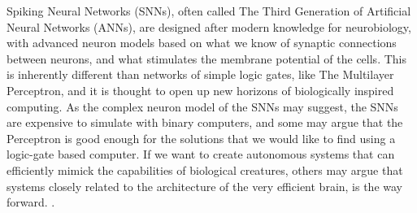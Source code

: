Spiking Neural Networks (SNNs), often called The Third Generation of Artificial Neural Networks (ANNs), are designed after modern knowledge for neurobiology,
with advanced neuron models based on what we know of synaptic connections between neurons, and what stimulates the membrane potential of the cells.\cite{ghosh-dastidar_improved_2007}
This is inherently different than networks of simple logic gates, like The Multilayer Perceptron, and it is thought to open up new horizons of biologically inspired computing.\cite{cowan_discussion_1990} \cite{aamir_accelerated_2018}
As the complex neuron model of the SNNs may suggest, the SNNs are expensive to simulate with binary computers, and some may argue that the Perceptron is good enough for the solutions that we would like to find using a logic-gate based computer.
If we want to create autonomous systems that can efficiently mimick the capabilities of biological creatures, others may argue that systems closely related to the architecture of the very efficient brain, is the way forward.\cite{lee_training_2016} \cite{cao_spiking_2015}.



